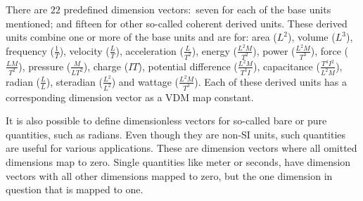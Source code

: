 \documentclass[runningheads,a4paper]{llncs}
\begin{document}
There are \(22\) predefined dimension vectors:~seven for each of the base units mentioned; and fifteen for other so-called coherent derived units. These derived units combine one or more of the base units and are for:
%
%
area (\(L^2\)), volume (\(L^3\)), frequency (\(\frac{1}{T}\)), velocity (\(\frac{L}{T}\)), acceleration (\(\frac{L}{T^2}\)), energy (\(\frac{L^2M}{T^2}\)), power (\(\frac{L^2M}{T^3}\)), force (\(\frac{LM}{T^2}\)), pressure (\(\frac{M}{LT^2}\)), charge (\(IT\)), potential difference (\(\frac{L^2M}{T^3I}\)), capacitance (\(\frac{T^4I^2}{L^2M}\)), radian (\(\frac{L}{L}\)), steradian (\(\frac{L^2}{L^2}\)) and wattage (\(\frac{L^2M}{T^3}\)). 
%
Each of these derived units has a corresponding dimension vector as a VDM map constant. 

It is also possible to define dimensionless vectors for so-called bare or pure quantities, such as radians. Even though they are non-SI units, such quantities are useful for various applications. These are dimension vectors where all omitted dimensions map to zero. Single quantities like meter or seconds, have dimension vectors with all other dimensions mapped to zero, but the one dimension in question that is mapped to one.  
\end{document}
